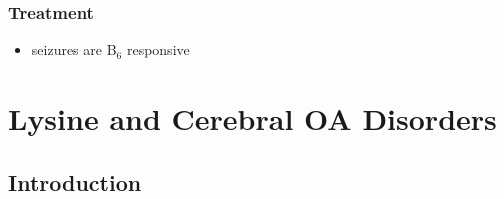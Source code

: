 \documentclass{scrartcl}
\begin{document}
\subsubsection{Treatment}
\label{sec:org72fb468}
\begin{itemize}
\item seizures are B\(_{\text{6}}\) responsive
\end{itemize}

\section{Lysine and Cerebral OA Disorders}
\label{sec:orgc604556}
\subsection{Introduction}
\label{sec:org9589dbf}
\end{document}
